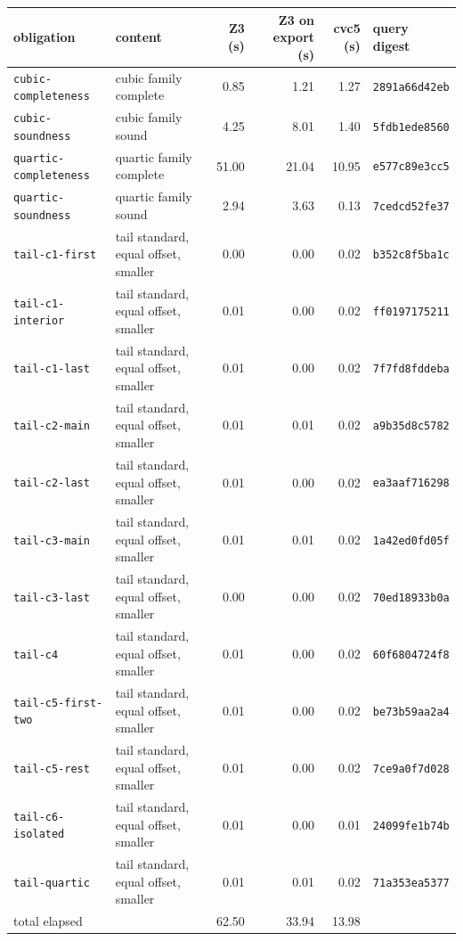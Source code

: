 \begin{tabular}{@{}llrrrl@{}}
\toprule
obligation & content & Z3 (s) & Z3 on export (s) & cvc5 (s) & query digest\\
\midrule
\texttt{cubic-completeness} & cubic family complete & 0.85 & 1.21 & 1.27 & \texttt{2891a66d42eb}\\
\texttt{cubic-soundness} & cubic family sound & 4.25 & 8.01 & 1.40 & \texttt{5fdb1ede8560}\\
\texttt{quartic-completeness} & quartic family complete & 51.00 & 21.04 & 10.95 & \texttt{e577c89e3cc5}\\
\texttt{quartic-soundness} & quartic family sound & 2.94 & 3.63 & 0.13 & \texttt{7cedcd52fe37}\\
\texttt{tail-c1-first} & tail standard, equal offset, smaller & 0.00 & 0.00 & 0.02 & \texttt{b352c8f5ba1c}\\
\texttt{tail-c1-interior} & tail standard, equal offset, smaller & 0.01 & 0.00 & 0.02 & \texttt{ff0197175211}\\
\texttt{tail-c1-last} & tail standard, equal offset, smaller & 0.01 & 0.00 & 0.02 & \texttt{7f7fd8fddeba}\\
\texttt{tail-c2-main} & tail standard, equal offset, smaller & 0.01 & 0.01 & 0.02 & \texttt{a9b35d8c5782}\\
\texttt{tail-c2-last} & tail standard, equal offset, smaller & 0.01 & 0.00 & 0.02 & \texttt{ea3aaf716298}\\
\texttt{tail-c3-main} & tail standard, equal offset, smaller & 0.01 & 0.01 & 0.02 & \texttt{1a42ed0fd05f}\\
\texttt{tail-c3-last} & tail standard, equal offset, smaller & 0.00 & 0.00 & 0.02 & \texttt{70ed18933b0a}\\
\texttt{tail-c4} & tail standard, equal offset, smaller & 0.01 & 0.00 & 0.02 & \texttt{60f6804724f8}\\
\texttt{tail-c5-first-two} & tail standard, equal offset, smaller & 0.01 & 0.00 & 0.02 & \texttt{be73b59aa2a4}\\
\texttt{tail-c5-rest} & tail standard, equal offset, smaller & 0.01 & 0.00 & 0.02 & \texttt{7ce9a0f7d028}\\
\texttt{tail-c6-isolated} & tail standard, equal offset, smaller & 0.01 & 0.00 & 0.01 & \texttt{24099fe1b74b}\\
\texttt{tail-quartic} & tail standard, equal offset, smaller & 0.01 & 0.01 & 0.02 & \texttt{71a353ea5377}\\
\midrule
total elapsed & & 62.50 & 33.94 & 13.98 & \\
\bottomrule
\end{tabular}

